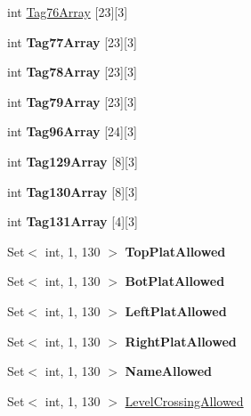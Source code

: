 \begin{DoxyCompactItemize}
int \mbox{\hyperlink{class_t_track_a8dc657245d548b3b07fdb42e173f3bba}{Tag76\+Array}} \mbox{[}23\mbox{]}\mbox{[}3\mbox{]}
\item 
\mbox{\label{class_t_track_a4f05f2ae83cb9f85930df970b7844c4b}} 
int {\bfseries Tag77\+Array} \mbox{[}23\mbox{]}\mbox{[}3\mbox{]}
\item 
\mbox{\label{class_t_track_a4b4b28532e1317000b4387a9b37ff981}} 
int {\bfseries Tag78\+Array} \mbox{[}23\mbox{]}\mbox{[}3\mbox{]}
\item 
\mbox{\label{class_t_track_ab95da137dad09b9c8cd3fc673b80e841}} 
int {\bfseries Tag79\+Array} \mbox{[}23\mbox{]}\mbox{[}3\mbox{]}
\item 
\mbox{\label{class_t_track_a689870b6bccd25e8b8980e363ad646d0}} 
int {\bfseries Tag96\+Array} \mbox{[}24\mbox{]}\mbox{[}3\mbox{]}
\item 
\mbox{\label{class_t_track_ac54feeb3cf1699bde9e4ac88d76d88fb}} 
int {\bfseries Tag129\+Array} \mbox{[}8\mbox{]}\mbox{[}3\mbox{]}
\item 
\mbox{\label{class_t_track_a33e00a86d9cb4b0402c08144f9ab563b}} 
int {\bfseries Tag130\+Array} \mbox{[}8\mbox{]}\mbox{[}3\mbox{]}
\item 
\mbox{\label{class_t_track_aff5c466da1dda0b20e1f770253ad2813}} 
int {\bfseries Tag131\+Array} \mbox{[}4\mbox{]}\mbox{[}3\mbox{]}
\item 
\mbox{\label{class_t_track_aebfb764fdd1bddb8f82b943e5af9979b}} 
Set$<$ int, 1, 130 $>$ {\bfseries Top\+Plat\+Allowed}
\item 
\mbox{\label{class_t_track_a0b2e23790782af830a0b206dcb9d9469}} 
Set$<$ int, 1, 130 $>$ {\bfseries Bot\+Plat\+Allowed}
\item 
\mbox{\label{class_t_track_a70fcf10b4a31240e4d103d04e7116926}} 
Set$<$ int, 1, 130 $>$ {\bfseries Left\+Plat\+Allowed}
\item 
\mbox{\label{class_t_track_a1cde503d01659ec96a735529aca8efcb}} 
Set$<$ int, 1, 130 $>$ {\bfseries Right\+Plat\+Allowed}
\item 
\mbox{\label{class_t_track_a44c0c3df5931635e578bfd17d51ecd31}} 
Set$<$ int, 1, 130 $>$ {\bfseries Name\+Allowed}
\item 
Set$<$ int, 1, 130 $>$ \mbox{\hyperlink{class_t_track_a29617e6f88e44a7974dc08a371682d0b}{Level\+Crossing\+Allowed}}
\end{DoxyCompactItemize}



